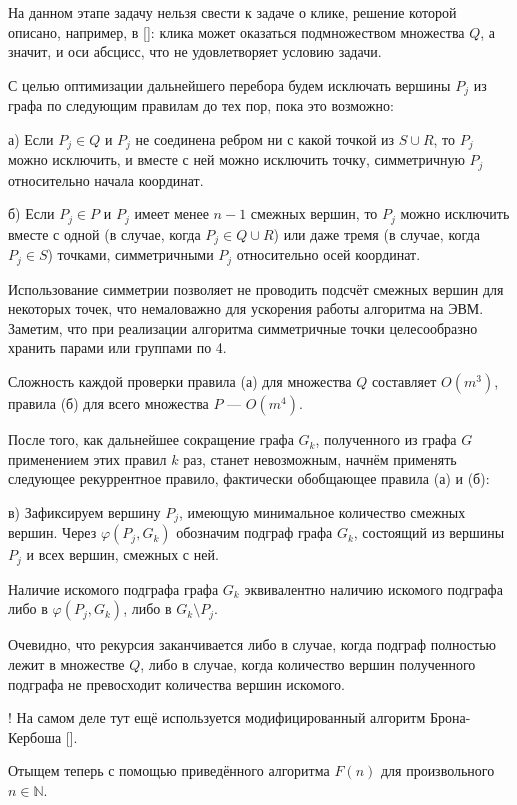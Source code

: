 \documentclass{article}
\begin{document}
На данном этапе задачу нельзя свести к задаче о клике, решение которой описано, например, в [\cite{BronKerbosh}]:
клика может оказаться подмножеством множества $Q$, а значит, и оси абсцисс, что не удовлетворяет условию задачи.

С целью оптимизации дальнейшего перебора будем исключать вершины $P_j$ из графа по следующим правилам до тех пор, пока это возможно:

а) Если $P_j \in Q$ и $P_j$ не соединена ребром ни с какой точкой из $S \cup R$, то $P_j$ можно исключить, и вместе с ней можно исключить точку, симметричную $P_j$ относительно начала координат.

б) Если $P_j \in P$ и $P_j$ имеет менее $n-1$ смежных вершин, то $P_j$ можно исключить вместе с одной (в случае, когда $P_j \in Q \cup R$) или даже тремя (в случае, когда $P_j \in S$) точками, симметричными $P_j$ относительно осей координат.

Использование симметрии позволяет не проводить подсчёт смежных вершин для некоторых точек, что немаловажно для ускорения работы алгоритма на ЭВМ.
Заметим, что при реализации алгоритма симметричные точки целесообразно хранить парами или группами по 4.

Сложность каждой проверки правила (а) для множества $Q$ составляет $O(m^3)$, правила (б) для всего множества $P$ --- $O(m^4)$.


После того, как дальнейшее сокращение графа $G_k$, полученного из графа $G$ применением этих правил $k$ раз, станет невозможным, начнём применять следующее рекуррентное правило, фактически обобщающее правила (а) и (б):

в)
Зафиксируем вершину $P_j$, имеющую минимальное количество смежных вершин.
Через $\varphi(P_j,G_k)$ обозначим подграф графа $G_k$, состоящий из вершины $P_j$ и всех вершин, смежных с ней.

Наличие искомого подграфа графа $G_k$ эквивалентно наличию искомого подграфа либо в $\varphi(P_j,G_k)$, либо в $G_k \setminus P_j$.

Очевидно, что рекурсия заканчивается либо в случае, когда подграф полностью лежит в множестве $Q$, либо в случае, когда количество вершин полученного подграфа не превосходит количества вершин искомого.


! На самом деле тут ещё используется модифицированный алгоритм Брона-Кербоша [\cite{BronKerbosh}].



Отыщем теперь с помощью приведённого алгоритма $F(n)$ для произвольного $n \in \mathbb{N}$.
\end{document}
